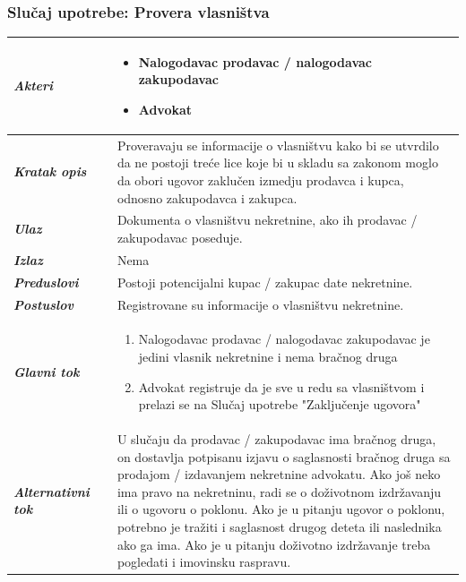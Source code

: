 \documentclass[20pt]{article}
\begin{document}
\subsubsection{\bfseries \large Slu\v{c}aj upotrebe: Provera vlasni\v stva}
\begin{center}
\begin{tabular}{p{0.23\linewidth} p{0.77\linewidth}}
 \hline
 {\it \bfseries Akteri} & \begin{itemize}
    \item Nalogodavac prodavac / nalogodavac zakupodavac
    \item Advokat
\end{itemize}\\
\hline

 {\it \bfseries Kratak opis} & Proveravaju se informacije o vlasni\v stvu kako bi se utvrdilo da ne postoji tre\' ce lice koje bi u skladu sa zakonom moglo da obori ugovor zaklu\v cen izmedju prodavca i kupca, odnosno zakupodavca i zakupca.\\ 
 \hline
 
 {\it \bfseries Ulaz} & Dokumenta o vlasni\v stvu nekretnine, ako ih prodavac / zakupodavac poseduje.\\ 
 \hline
 
 {\it \bfseries Izlaz} & Nema\\
 \hline
 
 {\it \bfseries Preduslovi} & Postoji potencijalni kupac / zakupac date nekretnine.\\
 \hline

 {\it \bfseries Postuslov} & Registrovane su informacije o vlasni\v stvu nekretnine.\\
 \hline

     {\it \bfseries Glavni tok} &  
     \begin{enumerate}
        \item Nalogodavac prodavac / nalogodavac zakupodavac je jedini vlasnik nekretnine i nema bra\v cnog druga
        \item Advokat registruje da je sve u redu sa vlasni\v stvom
        i prelazi se na Slu\v{c}aj upotrebe "Zaklju\v cenje ugovora"
    \end{enumerate}\\
 \hline
 {\it \bfseries Alternativni tok} & U slu\v caju da prodavac / zakupodavac ima bra\v cnog druga, on dostavlja potpisanu izjavu o saglasnosti bra\v cnog druga sa prodajom / izdavanjem nekretnine advokatu. Ako jo\v s neko ima pravo na nekretninu, radi se o do\v zivotnom izdr\v zavanju ili o ugovoru o poklonu. Ako je u pitanju ugovor o poklonu, potrebno je tra\v ziti i saglasnost drugog deteta ili naslednika ako ga ima. Ako je u pitanju do\v zivotno izdr\v zavanje treba pogledati i imovinsku raspravu. \\
 \hline
\end{tabular}
\end{center}
\end{document}
